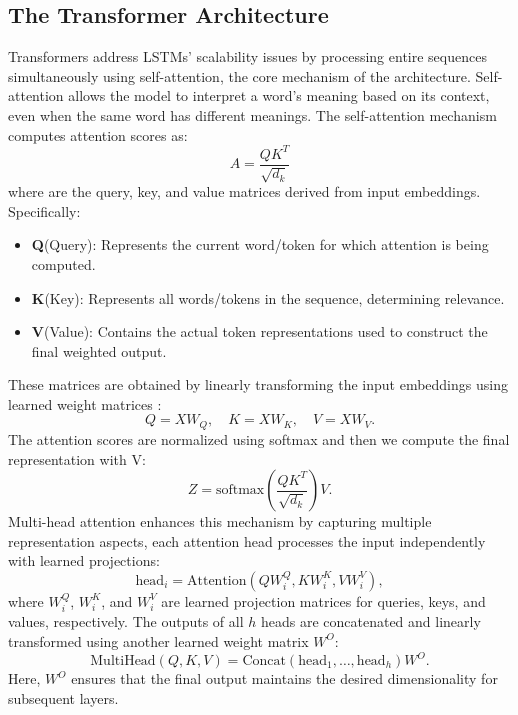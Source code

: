 \subsection{The Transformer Architecture}
Transformers address LSTMs' scalability issues by processing entire sequences simultaneously using self-attention, the core mechanism of the architecture. Self-attention allows the model to interpret a word’s meaning based on its context, even when the same word has different meanings. The self-attention mechanism computes attention scores as:
\begin{equation}
A = \frac{QK^T}{\sqrt{d_k}}
\end{equation}
where  are the query, key, and value matrices derived from input embeddings. Specifically:
\begin{itemize}
\item  \textbf{Q}(Query): Represents the current word/token for which attention is being computed.
\item  \textbf{K}(Key): Represents all words/tokens in the sequence, determining relevance.
\item  \textbf{V}(Value): Contains the actual token representations used to construct the final weighted output.
\end{itemize}
These matrices are obtained by linearly transforming the input embeddings using learned weight matrices :
\begin{equation}
Q = X W_Q, \quad K = X W_K, \quad V = X W_V.
\end{equation}
The attention scores are normalized using softmax and then we compute the final representation with V:
\begin{equation}
    Z = \text{softmax}\left( \frac{QK^T}{\sqrt{d_k}} \right)V.
\end{equation}
Multi-head attention enhances this mechanism by capturing multiple representation aspects, each attention head processes the input independently with learned projections:  
\[
\text{head}_i = \text{Attention}(Q W_i^Q, K W_i^K, V W_i^V),
\]  
where \( W_i^Q \), \( W_i^K \), and \( W_i^V \) are learned projection matrices for queries, keys, and values, respectively. The outputs of all \( h \) heads are concatenated and linearly transformed using another learned weight matrix \( W^O \):  
\[
\text{MultiHead}(Q, K, V) = \text{Concat}(\text{head}_1, \dots, \text{head}_h) W^O.
\]  
Here, \( W^O \) ensures that the final output maintains the desired dimensionality for subsequent layers.
